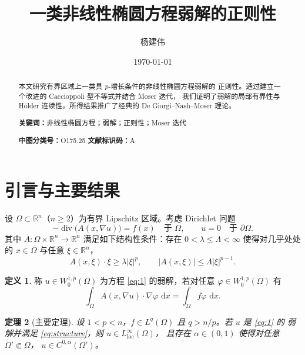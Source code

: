 \documentclass[12pt,a4paper,UTF8,fontset=fandol]{ctexart}
\title{一类非线性椭圆方程弱解的正则性}
\author{杨建伟}
\date{\today}
\newtheorem{theorem}{定理}[section]
\theoremstyle{definition}
\newtheorem{definition}[theorem]{定义}
\theoremstyle{remark}
\newcommand{\R}{\mathbb{R}}
\newcommand{\Om}{\Omega}
\newcommand{\paOm}{\partial\Omega}
\newcommand{\dd}{\,\mathrm{d}}
\DeclareMathOperator{\divg}{div}
\begin{document}
\maketitle

\begin{abstract}
\noindent 本文研究有界区域上一类具 $p$-增长条件的非线性椭圆方程弱解的
正则性。通过建立一个改进的 Caccioppoli 型不等式并结合 Moser 迭代，
我们证明了弱解的局部有界性与 Hölder 连续性。所得结果推广了经典的
De Giorgi--Nash--Moser 理论。

\smallskip
\noindent\textbf{关键词：}非线性椭圆方程；弱解；正则性；Moser 迭代

\smallskip
\noindent\textbf{中图分类号：}O175.25 \quad \textbf{文献标识码：}A
\end{abstract}

\section{引言与主要结果}

设 $\Om\subset\R^n$（$n\ge2$）为有界 Lipschitz 区域。考虑 Dirichlet 问题
\begin{equation}\label{eq:1}
  -\divg\bigl(A(x,\nabla u)\bigr)=f(x) \quad \text{于 } \Om,
  \qquad u=0 \quad \text{于 } \paOm .
\end{equation}
其中 $A:\Om\times\R^n\to\R^n$ 满足如下结构性条件：存在
$0<\lambda\le\Lambda<\infty$ 使得对几乎处处的 $x\in\Om$ 与任意
$\xi\in\R^n$，
\begin{equation}\label{eq:structure}
  A(x,\xi)\cdot\xi \ge \lambda|\xi|^p, \qquad
  |A(x,\xi)| \le \Lambda|\xi|^{p-1}.
\end{equation}

\begin{definition}\label{def:weak}
称 $u\in W^{1,p}_0(\Om)$ 为方程 \eqref{eq:1} 的弱解，若对任意
$\varphi\in W^{1,p}_0(\Om)$ 有
\begin{equation}
  \int_{\Om}A(x,\nabla u)\cdot\nabla\varphi\,\dd x
  = \int_{\Om} f\varphi\,\dd x .
\end{equation}
\end{definition}

\begin{theorem}[主要定理]\label{thm:main}
设 $1<p<n$，$f\in L^q(\Om)$ 且 $q>n/p$。若 $u$ 是 \eqref{eq:1} 的
弱解并满足 \eqref{eq:structure}，则 $u\in L^\infty_{\mathrm{loc}}(\Om)$，
且存在 $\alpha\in(0,1)$ 使得对任意 $\Om'\Subset\Om$，
$u\in C^{0,\alpha}(\Om')$。
\end{theorem}
\end{document}
